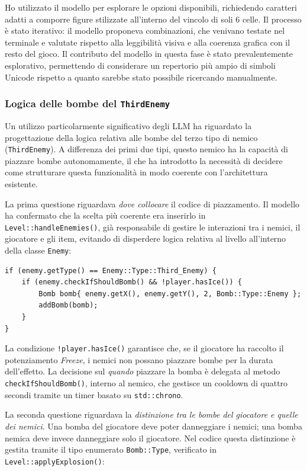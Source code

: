 \documentclass[a4paper,11pt]{article}
\begin{document}
Ho utilizzato il modello per esplorare le opzioni disponibili, richiedendo caratteri
adatti a comporre figure stilizzate all'interno del vincolo di soli 6 celle. Il
processo è stato iterativo: il modello proponeva combinazioni, che venivano testate
nel terminale e valutate rispetto alla leggibilità visiva e alla coerenza grafica con
il resto del gioco. Il contributo del modello in questa fase è stato prevalentemente
esplorativo, permettendo di considerare un repertorio più ampio di simboli Unicode
rispetto a quanto sarebbe stato possibile ricercando manualmente.
 
\subsubsection{Logica delle bombe del \texttt{ThirdEnemy}}
 
Un utilizzo particolarmente significativo degli LLM ha riguardato la progettazione
della logica relativa alle bombe del terzo tipo di nemico (\texttt{ThirdEnemy}).
A differenza dei primi due tipi, questo nemico ha la capacità di piazzare bombe
autonomamente, il che ha introdotto la necessità di decidere come strutturare questa
funzionalità in modo coerente con l'architettura esistente.
 
La prima questione riguardava \textit{dove collocare} il codice di piazzamento.
Il modello ha confermato che la scelta più coerente era inserirlo in
\texttt{Level::handleEnemies()}, già responsabile di gestire le interazioni tra i
nemici, il giocatore e gli item, evitando di disperdere logica relativa al livello
all'interno della classe \texttt{Enemy}:
 
\begin{verbatim}
if (enemy.getType() == Enemy::Type::Third_Enemy) {
    if (enemy.checkIfShouldBomb() && !player.hasIce()) {
        Bomb bomb{ enemy.getX(), enemy.getY(), 2, Bomb::Type::Enemy };
        addBomb(bomb);
    }
}
\end{verbatim}
 
La condizione \texttt{!player.hasIce()} garantisce che, se il giocatore ha raccolto
il potenziamento \textit{Freeze}, i nemici non possano piazzare bombe per la durata
dell'effetto. La decisione sul \textit{quando} piazzare la bomba è delegata al metodo
\texttt{checkIfShouldBomb()}, interno al nemico, che gestisce un cooldown di quattro
secondi tramite un timer basato su \texttt{std::chrono}.
 
La seconda questione riguardava la \textit{distinzione tra le bombe del giocatore e
quelle dei nemici}. Una bomba del giocatore deve poter danneggiare i nemici; una
bomba nemica deve invece danneggiare solo il giocatore. Nel codice questa distinzione
è gestita tramite il tipo enumerato \texttt{Bomb::Type}, verificato in
\texttt{Level::applyExplosion()}:
 
\end{document}
